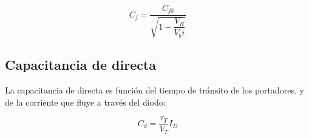 \[ C_j = \dfrac{C_{j0}}{\sqrt{1 - \dfrac{V_R}{V_bi}}} \]


\subsection{Capacitancia de directa}

La capacitancia de directa es función del tiempo de tránsito de los portadores, y de la corriente que fluye a través del diodo:

\[ C_d = \dfrac{\tau_T}{V_T} I_D \]




